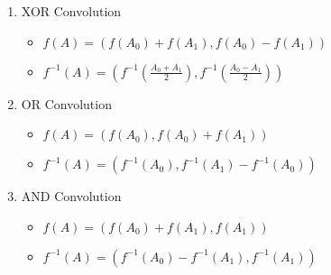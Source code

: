 \begin{enumerate}
    \item XOR Convolution
        \vspace{-1em}
        \begin{itemize}
            \itemsep-0.3em
            \item $f(A) = (f(A_0) + f(A_1), f(A_0) - f(A_1))$
            \item $f^{-1}(A) = (f^{-1}(\frac{A_0 + A_1}{2}), f^{-1}(\frac{A_0 - A_1}{2}))$
        \end{itemize}
    \item OR Convolution
        \vspace{-1em}
        \begin{itemize}
            \itemsep-0.3em
            \item $f(A) = (f(A_0), f(A_0) + f(A_1))$
            \item $f^{-1}(A) = (f^{-1}(A_0), f^{-1}(A_1) - f^{-1}(A_0))$
        \end{itemize}
    \item AND Convolution
        \vspace{-1em}
        \begin{itemize}
            \itemsep-0.3em
            \item $f(A) = (f(A_0) + f(A_1), f(A_1))$
            \item $f^{-1}(A) = (f^{-1}(A_0) - f^{-1}(A_1), f^{-1}(A_1))$
        \end{itemize}
\end{enumerate}